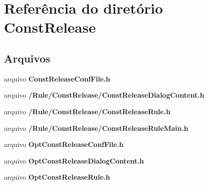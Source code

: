 \section{Referência do diretório Const\+Release}
\label{dir_438c556f88930b38123e6329c1009ead}
\subsection*{Arquivos}
\begin{DoxyCompactItemize}
\item 
arquivo {\bf Const\+Release\+Conf\+File.\+h}
\item 
arquivo {\bf /\+Rule/\+Const\+Release/\+Const\+Release\+Dialog\+Content.\+h}
\item 
arquivo {\bf /\+Rule/\+Const\+Release/\+Const\+Release\+Rule.\+h}
\item 
arquivo {\bf /\+Rule/\+Const\+Release/\+Const\+Release\+Rule\+Main.\+h}
\item 
arquivo {\bf Opt\+Const\+Release\+Conf\+File.\+h}
\item 
arquivo {\bf Opt\+Const\+Release\+Dialog\+Content.\+h}
\item 
arquivo {\bf Opt\+Const\+Release\+Rule.\+h}
\end{DoxyCompactItemize}
